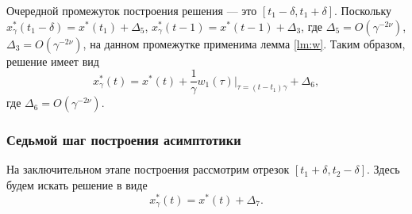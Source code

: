 Очередной промежуток построения решения --- это $[t_1-\delta, t_1+\delta]$. Поскольку $x^*_{\gamma}(t_1 - \delta) = x^*(t_1) + \Delta_5$, $x^*_{\gamma}(t - 1) = x^*(t - 1) + \Delta_3$, где $\Delta_5 = O(\gamma^{-2\nu})$, $\Delta_3 = O(\gamma^{-2\nu})$, на данном промежутке применима лемма \ref{lm:w}. Таким образом, решение имеет вид
\begin{equation}
	\label{eq:sol_6}
	x_{\gamma}^*(t) = x^*(t) + \frac{1}{\gamma} w_1(\tau)\bigg\vert_{\tau=(t - t_1)\gamma} + \Delta_6,
\end{equation}
где $\Delta_6 = O(\gamma^{-2\nu})$.


\subsubsection{Седьмой шаг построения асимптотики}

На заключительном этапе построения рассмотрим отрезок $[t_1+\delta, t_2-\delta]$. Здесь будем искать решение в виде
\begin{equation}
	\label{eq:sol_7}
	x_\gamma^*(t) = x^*(t) + \Delta_7.
\end{equation}

